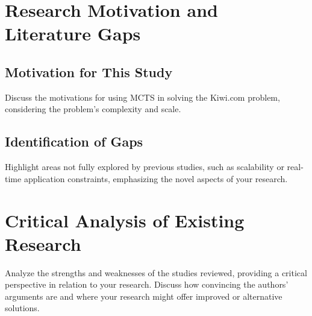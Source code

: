 \section{Research Motivation and Literature Gaps}
\subsection{Motivation for This Study}
Discuss the motivations for using MCTS in solving the Kiwi.com problem, considering the problem’s complexity and scale.
\subsection{Identification of Gaps}
Highlight areas not fully explored by previous studies, such as scalability or real-time application constraints, emphasizing the novel aspects of your research.

\section{Critical Analysis of Existing Research}
Analyze the strengths and weaknesses of the studies reviewed, providing a critical perspective in relation to your research. Discuss how convincing the authors' arguments are and where your research might offer improved or alternative solutions.

